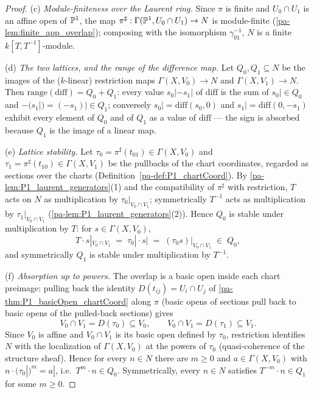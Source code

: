 \begin{proof}
  (c) \emph{Module-finiteness over the Laurent ring.} Since \(\pi\) is finite and
  \(U_0 \cap U_1\) is an affine open of \(\mathbb{P}^1\), the map
  \(\pi^\sharp : \Gamma(\mathbb{P}^1, U_0 \cap U_1) \to N\) is module-finite
  (\ref{pa-lem:finite_app_overlap}); composing with the isomorphism \(\gamma_{01}^{-1}\),
  \(N\) is a finite \(k[T,T^{-1}]\)-module.

  (d) \emph{The two lattices, and the range of the difference map.} Let
  \(Q_0, Q_1 \subseteq N\) be the images of the (\(k\)-linear) restriction maps
  \(\Gamma(X, V_0) \to N\) and \(\Gamma(X, V_1) \to N\). Then
  \(\mathrm{range}(\mathrm{diff}) = Q_0 + Q_1\): every value
  \(s_0| - s_1|\) of \(\mathrm{diff}\) is the sum of \(s_0| \in Q_0\) and
  \(-(s_1|) = (-s_1)| \in Q_1\); conversely \(s_0| = \mathrm{diff}(s_0, 0) \) and
  \(s_1| = \mathrm{diff}(0, -s_1)\) exhibit every element of \(Q_0\) and of \(Q_1\) as a
  value of \(\mathrm{diff}\) --- the sign is absorbed because \(Q_1\) is the image of a
  linear map.

  (e) \emph{Lattice stability.} Let
  \(\tau_0 = \pi^\sharp(t_{01}) \in \Gamma(X, V_0)\) and
  \(\tau_1 = \pi^\sharp(t_{10}) \in \Gamma(X, V_1)\) be the pullbacks of the chart
  coordinates, regarded as sections over the charts
  (Definition~\ref{pa-def:P1_chartCoord}). By \ref{pa-lem:P1_laurent_generators}(1) and the
  compatibility of \(\pi^\sharp\) with restriction, \(T\) acts on \(N\) as
  multiplication by \(\tau_0|_{V_0 \cap V_1}\); symmetrically \(T^{-1}\) acts as
  multiplication by \(\tau_1|_{V_0 \cap V_1}\) (\ref{pa-lem:P1_laurent_generators}(2)).
  Hence \(Q_0\) is stable under multiplication by \(T\): for \(s \in \Gamma(X, V_0)\),
  \[
    T \cdot s|_{V_0 \cap V_1} \;=\; \tau_0|\cdot s| \;=\; (\tau_0 s)|_{V_0 \cap V_1}
      \;\in\; Q_0,
  \]
  and symmetrically \(Q_1\) is stable under multiplication by \(T^{-1}\).

  (f) \emph{Absorption up to powers.} The overlap is a basic open inside each chart
  preimage: pulling back the identity \(D(t_{ij}) = U_i \cap U_j\) of
  \ref{pa-thm:P1_basicOpen_chartCoord} along \(\pi\) (basic opens of sections pull back to
  basic opens of the pulled-back sections) gives
  \[
    V_0 \cap V_1 = D(\tau_0) \subseteq V_0,
    \qquad
    V_0 \cap V_1 = D(\tau_1) \subseteq V_1 .
  \]
  Since \(V_0\) is affine and \(V_0 \cap V_1\) is its basic open defined by \(\tau_0\),
  restriction identifies \(N\) with the localization of \(\Gamma(X, V_0)\) at the powers
  of \(\tau_0\) (quasi-coherence of the structure sheaf). Hence for every \(n \in N\)
  there are \(m \ge 0\) and \(a \in \Gamma(X, V_0)\) with
  \(n \cdot (\tau_0|)^m = a|\), i.e.\ \(T^m \cdot n \in Q_0\). Symmetrically, every
  \(n \in N\) satisfies \(T^{-m} \cdot n \in Q_1\) for some \(m \ge 0\).


\end{proof}
